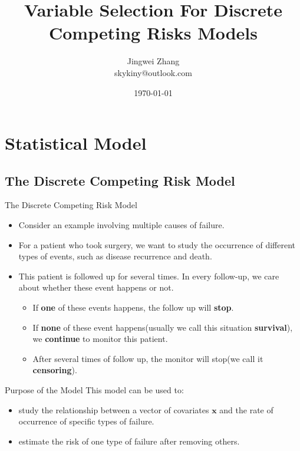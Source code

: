 \documentclass{beamer}
\title{Variable Selection For Discrete Competing Risks Models}
\date{\today}
\author{Jingwei Zhang\\
    {\ttfamily skykiny@outlook.com}
}
\begin{document}
    \maketitle
    
    
    \section{Statistical Model}
    \subsection{The Discrete Competing Risk Model}
    \begin{frame}{The Discrete Competing Risk Model}%
        \begin{itemize}
            \item Consider an example involving multiple causes of failure.
            \item For a patient who took surgery, we want to study the occurrence of different types of events, such as disease recurrence and death.
            \item This patient is followed up for several times. In every follow-up, we care about whether these event happens or not.
            \begin{itemize}
                \item If {\bf one} of these events happens, the follow up will {\bf stop}.
                \item If {\bf none} of these event happens(usually we call this situation {\bf survival}), we {\bf continue} to monitor this patient.
                \item After several times of follow up, the monitor will stop(we call it {\bf censoring}).
            \end{itemize}
        \end{itemize}
    \end{frame}
    
    \begin{frame}{Purpose of the Model}
        This model can be used to:
        \begin{itemize}
            \item study the relationship between a vector of covariates $\mathbf{x}$ and the rate of occurrence of specific types of failure.
            \item estimate the risk of one type of failure after removing others. 
        \end{itemize}
    \end{frame}
    
\end{document}
